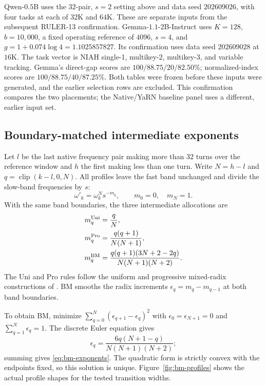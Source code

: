 Qwen-$0.5$B uses the $32$-pair, $s=2$ setting above and data seed
$202609026$, with four tasks at each of $32$K and $64$K. These are separate
inputs from the subsequent RULER-13 confirmation.
Gemma-$1.1$-$2$B-Instruct uses $K=128$, $b=10{,}000$, a fixed operating
reference of $4096$, $s=4$, and $g=1+0.074\log4=1.1025857827$.
Its confirmation uses data seed $202609028$ at $16$K.
The task vector is NIAH single-1, multikey-2, multikey-3, and variable tracking.
Gemma's direct-gap scores are $100/88.75/20/82.50\%$;
normalized-index scores are $100/88.75/40/87.25\%$.
Both tables were frozen before these inputs were generated, and the earlier
selection rows are excluded. This confirmation compares the two placements;
the Native/YaRN baseline panel uses a different, earlier input set.



\FloatBarrier
\subsection{Boundary-matched intermediate exponents}
\label{sec:bm-construction}

Let $l$ be the last native frequency pair making more than $32$ turns over
the reference window and $h$ the first making less than one turn. Write
$N=h-l$ and $q=\operatorname{clip}(k-l,0,N)$. All profiles leave the fast
band unchanged and divide the slow-band frequencies by $s$:
\begin{equation}
\omega'_k=\omega_k^N s^{-m_q},\qquad m_0=0,\quad m_N=1.
\end{equation}
With the same band boundaries, the three intermediate allocations are
\begin{align}
m_q^{\rm Uni}&=\frac{q}{N},\\
m_q^{\rm Pro}&=\frac{q(q+1)}{N(N+1)},\\
m_q^{\rm BM}&=\frac{q(q+1)(3N+2-2q)}{N(N+1)(N+2)}.
\label{eq:bm-exponents}
\end{align}
The Uni and Pro rules follow the uniform and progressive mixed-radix
constructions of \citet{tian2026mrrope}. BM smooths the radix increments
$\epsilon_q=m_q-m_{q-1}$ at both band boundaries.

To obtain BM, minimize
$\sum_{q=0}^{N}(\epsilon_{q+1}-\epsilon_q)^2$ with
$\epsilon_0=\epsilon_{N+1}=0$ and $\sum_{q=1}^{N}\epsilon_q=1$.
The discrete Euler equation gives
\[
\epsilon_q=\frac{6q(N+1-q)}{N(N+1)(N+2)};
\]
summing gives \eqref{eq:bm-exponents}. The quadratic form is strictly convex
with the endpoints fixed, so this solution is unique. Figure~\ref{fig:bm-profiles}
shows the actual profile shapes for the tested transition widths.

